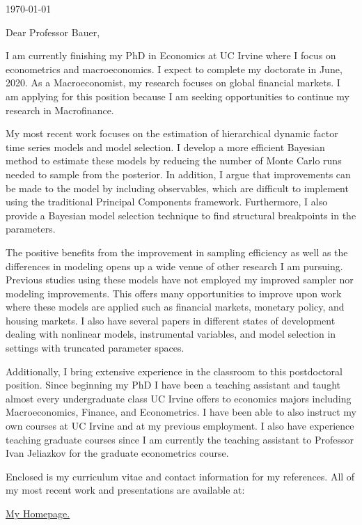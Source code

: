 \documentclass[uci,ee,10pt]{ucletterhead}
\begin{document}
\begin{letter}{

		\today
	}
	\opening{Dear Professor Bauer,}

		
		I am currently finishing my PhD in Economics at UC Irvine where I focus on econometrics and macroeconomics. I expect to complete my doctorate in June, 2020.  As a Macroeconomist, my research focuses on global financial markets. I am applying for this position because I am seeking opportunities to continue my research in Macrofinance. 

My most recent work focuses on the estimation of hierarchical dynamic factor time series models and model selection. I develop a more efficient Bayesian method to estimate these models by reducing the number of Monte Carlo runs needed to sample from the posterior. In addition, I argue that improvements can be made to the model by including observables, which are difficult to implement using the traditional Principal Components framework. Furthermore, I also provide a Bayesian model selection technique to find structural breakpoints in the parameters.

The positive benefits from the improvement in sampling efficiency as well as the differences in modeling opens up a wide venue of other research I am pursuing. Previous studies using these models have not employed my improved sampler nor modeling improvements. This offers many opportunities to improve upon work where these models are applied such as financial markets, monetary policy, and housing markets. I also have several papers in different states of development dealing with nonlinear models, instrumental variables, and model selection in settings with truncated parameter spaces. 

Additionally, I bring extensive experience in the classroom to this postdoctoral position. Since beginning my PhD I have been a teaching assistant and taught almost every undergraduate class UC Irvine offers to economics majors including Macroeconomics, Finance, and Econometrics. I have been able to also instruct my own courses at UC Irvine and at my previous employment. I also have experience teaching graduate courses since I am currently the teaching assistant to Professor Ivan Jeliazkov for the graduate econometrics course.   

Enclosed is my curriculum vitae and contact information for my references.  All of my most recent work and
presentations are available at:

\href{https://sites.google.com/view/dillonshomepage/home}{My Homepage.}


\end{letter}
\end{document}
